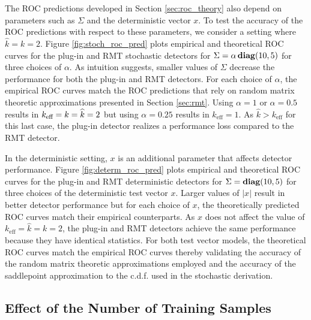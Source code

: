The ROC predictions developed in Section \ref{sec:roc_theory} also depend on parameters such as $\Sigma$ and the deterministic vector $x$. To test the accuracy of the ROC predictions with respect to these parameters, we consider a setting where $\widehat{k}=k = 2$. Figure \ref{fig:stoch_roc_pred} plots empirical and theoretical ROC curves for the plug-in and RMT stochastic detectors for $\Sigma=\alpha\mathop{\bf diag}(10,5)$ for three choices of $\alpha$. As intuition suggests, smaller values of $\Sigma$ decrease the performance for both the plug-in and RMT detectors. For each choice of $\alpha$, the empirical ROC curves match the ROC predictions that rely on random matrix theoretic approximations presented in Section \ref{sec:rmt}. Using $\alpha=1$ or $\alpha=0.5$ results in $k_\text{eff}=k=\widehat{k}=2$ but using $\alpha=0.25$ results in $k_\text{eff}=1$. As $\widehat{k}>k_\text{eff}$ for this last case, the plug-in detector realizes a performance loss compared to the RMT detector.

In the deterministic setting, $x$ is an additional parameter that affects detector performance. Figure \ref{fig:determ_roc_pred} plots empirical and theoretical ROC curves for the plug-in and RMT deterministic detectors for $\Sigma=\mathop{\bf diag}(10,5)$ for three choices of the deterministic test vector $x$. Larger values of $|x|$ result in better detector performance but for each choice of $x$, the theoretically predicted ROC curves match their empirical counterparts. As $x$ does not affect the value of $k_\text{eff}=\widehat{k}=k=2$, the plug-in and RMT detectors achieve the same performance because they have identical statistics. For both test vector models, the theoretical ROC curves match the empirical ROC curves thereby validating the accuracy of the random matrix theoretic approximations employed and the accuracy of the saddlepoint approximation to the c.d.f. used in the stochastic derivation. 

\subsection{Effect of the Number of Training Samples}

